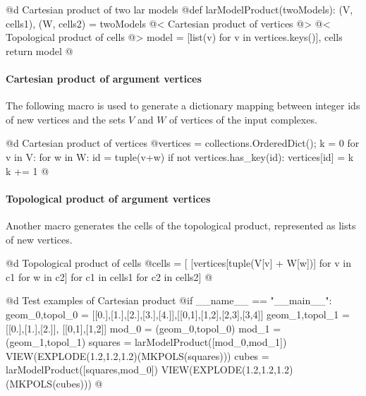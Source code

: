 \documentclass[11pt,oneside]{article}	%
\begin{document}
@d Cartesian product of two lar models  
@{def larModelProduct(twoModels):
    (V, cells1), (W, cells2) = twoModels
    @< Cartesian product of vertices @>
    @< Topological product of cells    @>
    model = [list(v) for v in vertices.keys()], cells
    return model
@}

\paragraph{Cartesian product of argument vertices}
The following macro is used to generate a dictionary mapping between integer ids of new vertices and the sets $V$ and $W$ of vertices of the input complexes.

@d Cartesian product of vertices  
@{vertices = collections.OrderedDict(); k = 0
for v in V:
    for w in W:
        id = tuple(v+w)
        if not vertices.has_key(id):
            vertices[id] = k
            k += 1	@}


\paragraph{Topological product of argument vertices}
Another macro generates the cells of the topological product, represented as lists of new vertices. 

@d Topological product of cells    
@{cells = [ [vertices[tuple(V[v] + W[w])] for v in c1 for w in c2]
         for c1 in cells1 for c2 in cells2]	@}


@d Test examples of Cartesian product
@{if __name__ == "__main__":
    geom_0,topol_0 = [[0.],[1.],[2.],[3.],[4.]],[[0,1],[1,2],[2,3],[3,4]]
    geom_1,topol_1 = [[0.],[1.],[2.]], [[0,1],[1,2]]
    mod_0 = (geom_0,topol_0)
    mod_1 = (geom_1,topol_1)
    squares = larModelProduct([mod_0,mod_1])
    VIEW(EXPLODE(1.2,1.2,1.2)(MKPOLS(squares)))
    cubes = larModelProduct([squares,mod_0])
    VIEW(EXPLODE(1.2,1.2,1.2)(MKPOLS(cubes)))
@}
\end{document}
